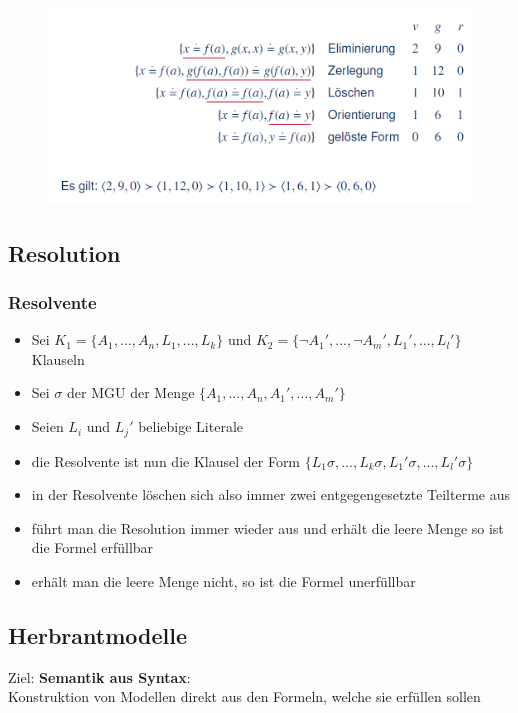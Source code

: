 \documentclass[12pt,a4paper]{article}
\begin{document}
\begin{figure}[H]
\includegraphics[scale=0.5]{./resources/uni_term.png}
\end{figure}

\subsection{Resolution}
\subsubsection{Resolvente}
\begin{itemize}
\item Sei $K_1 = \{A_1,...,A_n, L_1,...,L_k \}$ und $K_2 = \{\lnot A_1',...,\lnot A_m',L_1',...,L_l' \}$ Klauseln
\item Sei $\sigma$ der MGU der Menge $\{A_1,...,A_n,A_1',...,A_m' \}$
\item Seien $L_i$ und $L_j'$ beliebige Literale
\item die Resolvente ist nun die Klausel der Form $\{L_1 \sigma,...,L_k \sigma , L_1' \sigma,...,L_l' \sigma \}$
\item in der Resolvente löschen sich also immer zwei entgegengesetzte Teilterme aus
\item führt man die Resolution immer wieder aus und erhält die leere Menge so ist die Formel erfüllbar
\item erhält man die leere Menge nicht, so ist die Formel unerfüllbar
\end{itemize}

\subsection{Herbrantmodelle}
Ziel: \textbf{Semantik aus Syntax}:\\
Konstruktion von Modellen direkt aus den Formeln, welche sie erfüllen sollen
\end{document}

